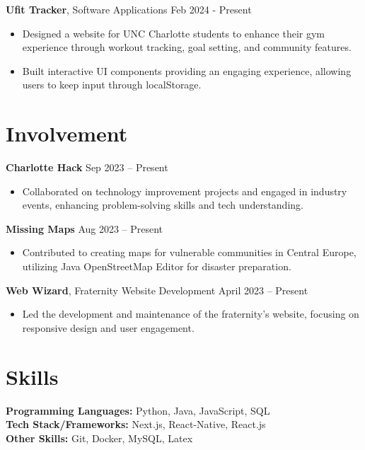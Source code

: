 \documentclass[a4paper,12pt]{article}
\begin{document}
\textbf{Ufit Tracker}, Software Applications \hfill Feb 2024 - Present
\begin{itemize}[noitemsep]
    \item Designed a website for UNC Charlotte students to enhance their gym experience through workout tracking, goal setting, and community features.
    \item Built interactive UI components providing an engaging experience, allowing users to keep input through localStorage.

\end{itemize}

\section{Involvement}

\textbf{Charlotte Hack} \hfill Sep 2023 – Present
\begin{itemize}[noitemsep]
    \item Collaborated on technology improvement projects and engaged in industry events, enhancing problem-solving skills and tech understanding.
\end{itemize}

\textbf{Missing Maps} \hfill Aug 2023 – Present
\begin{itemize}[noitemsep]
    \item Contributed to creating maps for vulnerable communities in Central Europe, utilizing Java OpenStreetMap Editor for disaster preparation.
\end{itemize}

\textbf{Web Wizard}, Fraternity Website Development \hfill April 2023 – Present
\begin{itemize}[noitemsep]
    \item Led the development and maintenance of the fraternity's website, focusing on responsive design and user engagement.
\end{itemize}

\section{Skills}
\textbf{Programming Languages:} Python, Java, JavaScript, SQL \\
\textbf{Tech Stack/Frameworks:} Next.js, React-Native, React.js \\
\textbf{Other Skills:} Git, Docker, MySQL, Latex

\vfill
{}
\end{document}

